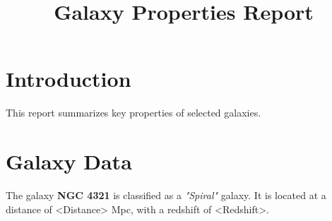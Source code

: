 \documentclass{article}
\title{Galaxy Properties Report}
\author{}
\date{}
\begin{document}
\maketitle

\section{Introduction}
This report summarizes key properties of selected galaxies.

\section{Galaxy Data}
The galaxy \textbf{NGC 4321} is classified as a \textit{"Spiral"} galaxy. 
It is located at a distance of <Distance> Mpc, with a redshift of <Redshift>.
\end{document}
